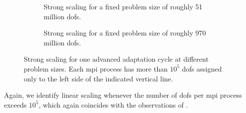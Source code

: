 \begin{figure}
\begin{subfigure}{1\textwidth}
  \centering
  \caption{Strong scaling for a fixed problem size of roughly 51 million \glspl{dof}.}
  \label{fig:strong-nrefs10}
\end{subfigure}
\begin{subfigure}{1\textwidth}
  \centering
  \caption{Strong scaling for a fixed problem size of roughly 970 million \glspl{dof}.}
  \label{fig:strong-nrefs12}
\end{subfigure}
\caption{Strong scaling for one advanced adaptation cycle at different problem sizes. Each \gls{mpi} process has more than $10^5$ \glspl{dof} assigned only to the left side of the indicated vertical line.}
\label{fig:strong}
\end{figure}

Again, we identify linear scaling whenever the number of \glspl{dof} per \gls{mpi} process exceeds $10^5$, which again coincides with the observations of \textcite{bangerth2012}.